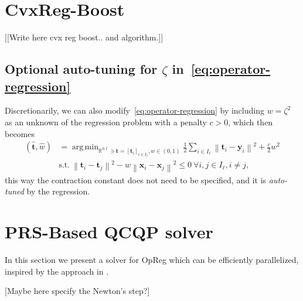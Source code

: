 \documentclass{article}
\DeclareMathOperator*{\argmin}{arg\,min}
\newcommand{\norm}[1]{\left\lVert#1\right\rVert}
\newcommand{\R}{\mathbb{R}}
\newcommand{\tv}{\mathbold{t}}
\newcommand{\x}{\mathbold{x}}
\newcommand{\y}{\mathbold{y}}
\newcommand{\andrea}[1]{{\color{red}[#1]}}
\begin{document}
\newpage 





\newpage
\appendix

\section{CvxReg-Boost}

\andrea{[Write here cvx reg boost.. and algorithm.]}


\subsection{Optional auto-tuning for $\zeta$ in~\eqref{eq:operator-regression}}

Discretionarily, we can also modify~\eqref{eq:operator-regression} by including $w = \zeta^2$ as an unknown of the regression problem with a penalty $c>0$, which then becomes
\begin{equation}
\begin{split}
	(\hat{\tv}, \hat{w}) &= \argmin_{ \R^{n\ell} \ni \tv = [\tv_i]_{i \in I_{\ell}}, w \in (0,1)} \frac{1}{2} \sum_{i \in I_{\ell}} \norm{\tv_i - \y_i}^2 + \frac{c}{2} w^2 \\
	&\text{s.t.} \ \norm{\tv_i - \tv_j}^2 - w \norm{\x_i - \x_j}^2 \leq 0 \ \forall i,j \in I_{\ell}, i \neq j,
\end{split}
\end{equation}
this way the contraction constant does not need to be specified, and it is \emph{auto-tuned} by the regression.

\section{PRS-Based QCQP solver}
In this section we present a solver for OpReg which can be efficiently parallelized, inspired by the approach in \cite{simonetto_smooth_2021}.

[Maybe here specify the Newton's step?]

\end{document}
